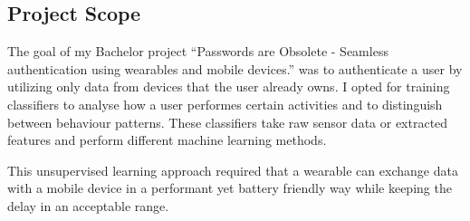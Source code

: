 \subsection{Project Scope}
The goal of my Bachelor project ``Passwords are Obsolete - Seamless authentication using wearables and mobile devices.'' was to authenticate a user by utilizing only data from devices that the user already owns. I opted for training classifiers to analyse how a user performes certain activities and to distinguish between behaviour patterns. These classifiers take raw sensor data or extracted features and perform different machine learning methods.

This unsupervised learning approach required that a wearable can exchange data with a mobile device in a performant yet battery friendly way while keeping the delay in an acceptable range.

\clearpage